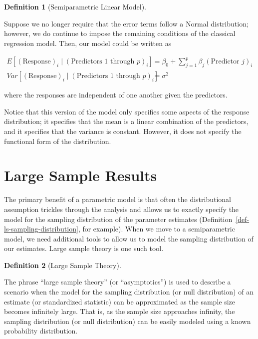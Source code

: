 \documentclass[
  letterpaper,
  DIV=11,
  numbers=noendperiod]{scrreprt}
\theoremstyle{definition}
\newtheorem{definition}{Definition}[chapter]
\theoremstyle{definition}
\theoremstyle{remark}
\begin{document}
\begin{definition}[Semiparametric Linear
Model]\protect\hypertarget{def-semiparametric-linear-model}{}\label{def-semiparametric-linear-model}

Suppose we no longer require that the error terms follow a Normal
distribution; however, we do continue to impose the remaining conditions
of the classical regression model. Then, our model could be written as

\[
\begin{aligned}
  E\left[(\text{Response})_i \mid (\text{Predictors 1 through } p)_i\right]
    &= \beta_0 + \sum\limits_{j=1}^{p} \beta_j (\text{Predictor } j)_i \\
  Var\left[(\text{Response})_i \mid (\text{Predictors 1 through } p)_i\right]
    &= \sigma^2
\end{aligned}
\]

where the responses are independent of one another given the predictors.

\end{definition}

Notice that this version of the model only specifies some aspects of the
response distribution; it specifies that the mean is a linear
combination of the predictors, and it specifies that the variance is
constant. However, it does not specify the functional form of the
distribution.

\hypertarget{large-sample-results}{%
\section{Large Sample Results}\label{large-sample-results}}

The primary benefit of a parametric model is that often the
distributional assumption trickles through the analysis and allows us to
exactly specify the model for the sampling distribution of the parameter
estimates (Definition~\ref{def-ls-sampling-distribution}, for example).
When we move to a semiparametric model, we need additional tools to
allow us to model the sampling distribution of our estimates. Large
sample theory is one such tool.

\begin{definition}[Large Sample
Theory]\protect\hypertarget{def-large-sample-theory}{}\label{def-large-sample-theory}

The phrase ``large sample theory'' (or ``asymptotics'') is used to
describe a scenario when the model for the sampling distribution (or
null distribution) of an estimate (or standardized statistic) can be
approximated as the sample size becomes infinitely large. That is, as
the sample size approaches infinity, the sampling distribution (or null
distribution) can be easily modeled using a known probability
distribution.

\end{definition}
\end{document}
